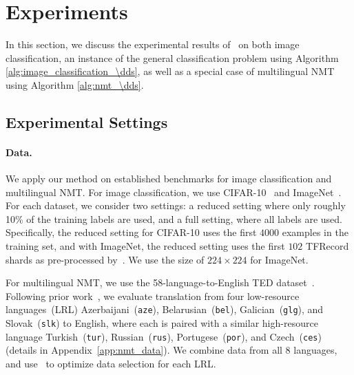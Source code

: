 \section{\label{sec:experiment}Experiments}
In this section, we discuss the experimental results of \dds~on both image classification, an instance of the general classification problem using Algorithm \ref{alg:image_classification_\dds}, as well as a special case of multilingual NMT using Algorithm \ref{alg:nmt_\dds}.

\subsection{\label{exp:settings}Experimental Settings}

\paragraph{Data.} We apply our method on established benchmarks for image classification and multilingual NMT.
For image classification, we use CIFAR-10~\citep{cifar10} and ImageNet~\citep{imagenet}. For each dataset, we consider two settings: a reduced setting where only roughly 10\% of the training labels are used, and a full setting, where all labels are used. Specifically, the reduced setting for CIFAR-10 uses the first $4000$ examples in the training set, and with ImageNet, the reduced setting uses the first $102$ TFRecord shards as pre-processed by~\citet{imagenet_generalize_better}. We use the size of $224 \times 224$ for ImageNet.

For multilingual NMT, we use the 58-language-to-English TED dataset~\citep{ted_pretrain_emb}. 
Following prior work~\citep{ted_pretrain_emb,rapid_adapt_nmt,SDE}, we evaluate translation from four low-resource languages~(LRL) Azerbaijani~(\texttt{aze}), Belarusian~(\texttt{bel}), Galician~(\texttt{glg}), and Slovak~(\texttt{slk}) to English, where each is paired with a similar high-resource language Turkish~(\texttt{tur}), Russian~(\texttt{rus}), Portugese~(\texttt{por}), and Czech~(\texttt{ces}) (details in Appendix~\ref{app:nmt_data}).
We combine data from all 8 languages, and use \dds~to optimize data selection for each LRL. 

